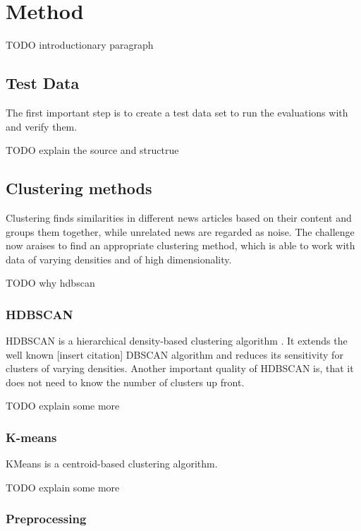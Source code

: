 \section{Method}

TODO introductionary paragraph

\subsection{Test Data}

The first important step is to create a test data set to run the evaluations with and verify them.

TODO explain the source and structrue

\subsection{Clustering methods}

Clustering finds similarities in different news articles based on their content and groups them together, while unrelated news are regarded as noise. The challenge now araises to find an appropriate clustering method, which is able to work with data of varying densities and of high dimensionality.

TODO why hdbscan

\subsubsection{HDBSCAN}

HDBSCAN is a hierarchical density-based clustering algorithm \cite{McInnes2017}. It extends the well known [insert citation] DBSCAN algorithm and reduces its sensitivity for clusters of varying densities. Another important quality of HDBSCAN is, that it does not need to know the number of clusters up front.

 TODO explain some more

\subsubsection{K-means}

KMeans is a centroid-based clustering algorithm. 

 TODO explain some more

\subsubsection{Preprocessing}

